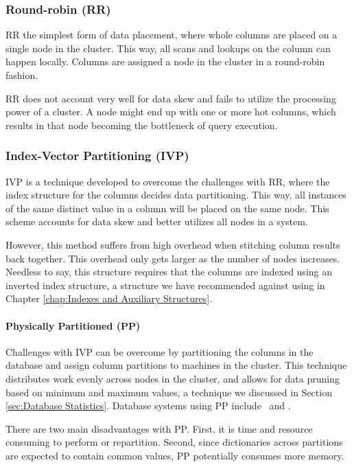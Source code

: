 \subsubsection{Round-robin (RR)}
\label{ssub:Round-robin (RR)}
RR the simplest form of data placement, where whole columns are placed on a single node in the cluster. This way, all scans and lookups on the column can happen locally. Columns are assigned a node in the cluster in a round-robin fashion.

RR does not account very well for data skew and fails to utilize the processing power of a cluster. A node might end up with one or more hot columns, which results in that node becoming the bottleneck of query execution.

\subsubsection{Index-Vector Partitioning (IVP)}
\label{ssub:Index-Vector Partitioning (IVP)}
IVP is a technique developed to overcome the challenges with RR, where the index structure for the columns decides data partitioning. This way, all instances of the same distinct value in a column will be placed on the same node. This scheme accounts for data skew and better utilizes all nodes in a system.

However, this method suffers from high overhead when stitching column results back together. This overhead only gets larger as the number of nodes increases. Needless to say, this structure requires that the columns are indexed using an inverted index structure, a structure we have recommended against using in Chapter \ref{chap:Indexes and Auxiliary Structures}.

\paragraph{Physically Partitioned (PP)}
\label{par:Physically Partitioned (PP)}
Challenges with IVP can be overcome by partitioning the columns in the database and assign column partitions to machines in the cluster. This technique distributes work evenly across nodes in the cluster, and allows for data pruning based on minimum and maximum values, a technique we discussed in Section \ref{sec:Database Statistics}. Database systems using PP include \oracle~and \saph.

There are two main disadvantages with PP. First, it is time and resource consuming to perform or repartition. Second, since dictionaries across partitions are expected to contain common values, PP potentially consumes more memory.

